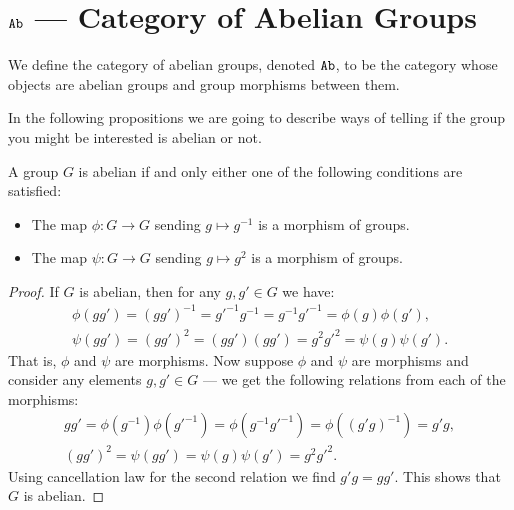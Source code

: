 \section{\texorpdfstring{\({\texttt{Ab}}\)}{Ab} --- Category of Abelian Groups}

\begin{definition}
    We define the category of abelian groups, denoted \({\texttt{Ab}}\), to be the category
    whose objects are abelian groups and group morphisms between them.
\end{definition}

In the following propositions we are going to describe ways of telling if the
group you might be interested is abelian or not.

\begin{proposition}
    A group \(G\) is abelian if and only either one of the following conditions
    are satisfied:
    \begin{itemize}
        \setlength\itemsep{0em}
        \item The map \(\phi: G \to G\) sending \(g \mapsto g^{-1}\) is a morphism of
              groups.
        \item The map \(\psi: G \to G\) sending \(g \mapsto g^2\) is a morphism of
              groups.
    \end{itemize}
\end{proposition}

\begin{proof}
    If \(G\) is abelian, then for any \(g, g' \in G\) we have:
    \begin{gather*}
        \phi(gg') = (gg')^{-1} = g'^{-1} g^{-1} = g^{-1}g'^{-1} = \phi(g) \phi(g'),
        \\
        \psi(gg') = (gg')^2 = (gg')(gg') = g^2g'^2 = \psi(g)\psi(g').
    \end{gather*}
    That is, \(\phi\) and \(\psi\) are morphisms. Now suppose \(\phi\) and
    \(\psi\) are morphisms and consider any elements \(g, g' \in G\) --- we get
    the following relations from each of the morphisms:
    \begin{gather*}
        gg' = \phi(g^{-1})\phi(g'^{-1}) = \phi(g^{-1}g'^{-1})
        = \phi((g'g)^{-1}) = g'g,
        \\
        (gg')^2 = \psi(gg') = \psi(g) \psi(g') = g^2 g'^2.
    \end{gather*}
    Using cancellation law for the second relation we find \(g'g = gg'\). This
    shows that \(G\) is abelian.
\end{proof}

